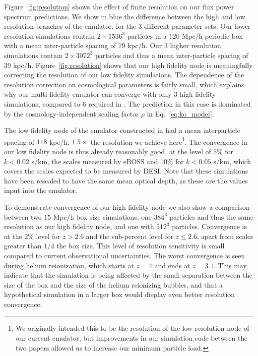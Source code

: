 \documentclass[a4paper,11pt]{article}
\begin{document}
Figure~\ref{fig:resolution} shows the effect of finite resolution on our flux power spectrum predictions. We show in blue the difference between the high and low resolution branches of the emulator, for the $3$ different parameter sets. Our lower resolution simulations contain $2\times 1536^3$ particles in a $120$ Mpc/h periodic box with a mean inter-particle spacing of $79$ kpc/h. Our $3$ higher resolution simulations contain $2\times 3072^3$ particles and thus a mean inter-particle spacing of $39$ kpc/h. Figure~\ref{fig:resolution} shows that our high fidelity node is meaningfully correcting the resolution of our low fidelity simulations. The dependence of the resolution correction on cosmological parameters is fairly small, which explains why our multi-fidelity emulator can converge with only $3$ high fidelity simulations, compared to $6$ required in \cite{Fernandez:2022}. The prediction in this case is dominated by the cosmology-independent scaling factor $\rho$ in Eq.~\ref{eq:ko_model}.

The low fidelity node of the emulator constructed in \cite{Fernandez:2022} had a mean interparticle spacing of $118$ kpc/h, $1.5 \times$ the resolution we achieve here\footnote{We originally intended this to be the resolution of the low resolution node of our current emulator, but improvements in our simulation code between the two papers allowed us to increase our minimum particle load.}. The convergence in our low fidelity node is thus already reasonably good, at the level of $5\%$ for $k < 0.02$ s/km, the scales measured by eBOSS and $10\%$ for $k < 0.05$ s/km, which covers the scales expected to be measured by DESI. Note that these simulations have been rescaled to have the same mean optical depth, as these are the values input into the emulator.

To demonstrate convergence of our high fidelity node we also show a comparison between two $15$ Mpc/h box size simulations, one $384^3$ particles and thus the same resolution as our high fidelity node, and one with $512^3$ particles. Convergence is at the $2\%$ level for $z > 2.6$ and the sub-percent level for $z \leq 2.6$, apart from scales greater than $1/4$ the box size. This level of resolution sensitivity is small compared to current observational uncertainties.
The worst convergence is seen during helium reionization, which starts at $z=4$ and ends at $z=3.1$. This may indicate that the simulation is being affected by the small separation between the size of the box and the size of the helium reionizing bubbles, and that a hypothetical simulation in a larger box would display even better resolution convergence.
\end{document}
